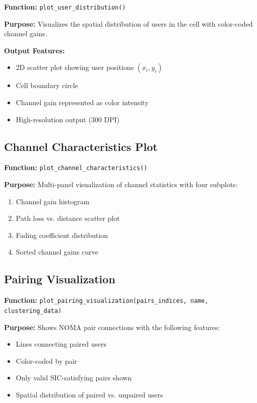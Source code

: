\documentclass[12pt,a4paper]{article}
\newcommand{\code}[1]{\texttt{#1}}
\begin{document}
\textbf{Function:} \code{plot\_user\_distribution()}

\textbf{Purpose:} Visualizes the spatial distribution of users in the cell with color-coded channel gains.

\textbf{Output Features:}
\begin{itemize}
    \item 2D scatter plot showing user positions $(x_i, y_i)$
    \item Cell boundary circle
    \item Channel gain represented as color intensity
    \item High-resolution output (300 DPI)
\end{itemize}

\subsection{Channel Characteristics Plot}

\textbf{Function:} \code{plot\_channel\_characteristics()}

\textbf{Purpose:} Multi-panel visualization of channel statistics with four subplots:
\begin{enumerate}
    \item Channel gain histogram
    \item Path loss vs. distance scatter plot
    \item Fading coefficient distribution
    \item Sorted channel gains curve
\end{enumerate}

\subsection{Pairing Visualization}

\textbf{Function:} \code{plot\_pairing\_visualization(pairs\_indices, name, clustering\_data)}

\textbf{Purpose:} Shows NOMA pair connections with the following features:
\begin{itemize}
    \item Lines connecting paired users
    \item Color-coded by pair
    \item Only valid SIC-satisfying pairs shown
    \item Spatial distribution of paired vs. unpaired users
\end{itemize}
\end{document}
